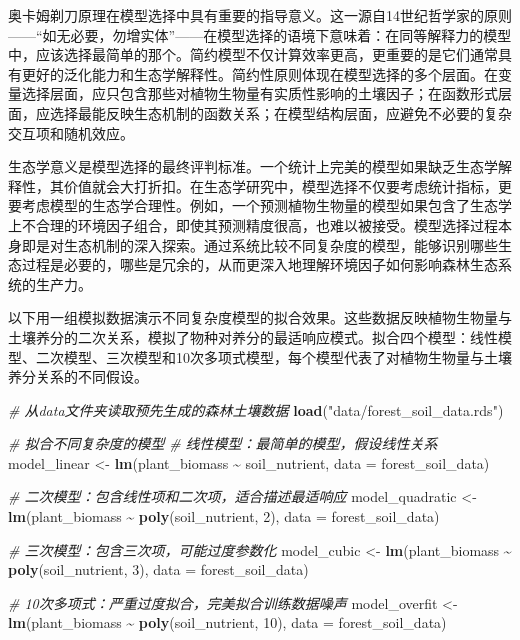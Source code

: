 \documentclass[
  twoside,12pt,fontset=none]{ctexbook}
\newenvironment{Shaded}{\begin{snugshade}}{\end{snugshade}}
\newcommand{\AttributeTok}[1]{\textcolor[rgb]{0.13,0.29,0.53}{#1}}
\newcommand{\CommentTok}[1]{\textcolor[rgb]{0.56,0.35,0.01}{\textit{#1}}}
\newcommand{\DecValTok}[1]{\textcolor[rgb]{0.00,0.00,0.81}{#1}}
\newcommand{\FunctionTok}[1]{\textcolor[rgb]{0.13,0.29,0.53}{\textbf{#1}}}
\newcommand{\NormalTok}[1]{#1}
\newcommand{\OtherTok}[1]{\textcolor[rgb]{0.56,0.35,0.01}{#1}}
\newcommand{\SpecialCharTok}[1]{\textcolor[rgb]{0.81,0.36,0.00}{\textbf{#1}}}
\newcommand{\StringTok}[1]{\textcolor[rgb]{0.31,0.60,0.02}{#1}}
\begin{document}
奥卡姆剃刀原理在模型选择中具有重要的指导意义。这一源自14世纪哲学家的原则------``如无必要，勿增实体''------在模型选择的语境下意味着：在同等解释力的模型中，应该选择最简单的那个。简约模型不仅计算效率更高，更重要的是它们通常具有更好的泛化能力和生态学解释性。简约性原则体现在模型选择的多个层面。在变量选择层面，应只包含那些对植物生物量有实质性影响的土壤因子；在函数形式层面，应选择最能反映生态机制的函数关系；在模型结构层面，应避免不必要的复杂交互项和随机效应。

生态学意义是模型选择的最终评判标准。一个统计上完美的模型如果缺乏生态学解释性，其价值就会大打折扣。在生态学研究中，模型选择不仅要考虑统计指标，更要考虑模型的生态学合理性。例如，一个预测植物生物量的模型如果包含了生态学上不合理的环境因子组合，即使其预测精度很高，也难以被接受。模型选择过程本身即是对生态机制的深入探索。通过系统比较不同复杂度的模型，能够识别哪些生态过程是必要的，哪些是冗余的，从而更深入地理解环境因子如何影响森林生态系统的生产力。

以下用一组模拟数据演示不同复杂度模型的拟合效果。这些数据反映植物生物量与土壤养分的二次关系，模拟了物种对养分的最适响应模式。拟合四个模型：线性模型、二次模型、三次模型和10次多项式模型，每个模型代表了对植物生物量与土壤养分关系的不同假设。

\begin{Shaded}
\begin{Highlighting}[]
\CommentTok{\# 从data文件夹读取预先生成的森林土壤数据}
\FunctionTok{load}\NormalTok{(}\StringTok{"data/forest\_soil\_data.rds"}\NormalTok{)}

\CommentTok{\# 拟合不同复杂度的模型}
\CommentTok{\# 线性模型：最简单的模型，假设线性关系}
\NormalTok{model\_linear }\OtherTok{\textless{}{-}} \FunctionTok{lm}\NormalTok{(plant\_biomass }\SpecialCharTok{\textasciitilde{}}\NormalTok{ soil\_nutrient, }\AttributeTok{data =}\NormalTok{ forest\_soil\_data)}

\CommentTok{\# 二次模型：包含线性项和二次项，适合描述最适响应}
\NormalTok{model\_quadratic }\OtherTok{\textless{}{-}} \FunctionTok{lm}\NormalTok{(plant\_biomass }\SpecialCharTok{\textasciitilde{}} \FunctionTok{poly}\NormalTok{(soil\_nutrient, }\DecValTok{2}\NormalTok{),}
  \AttributeTok{data =}\NormalTok{ forest\_soil\_data)}

\CommentTok{\# 三次模型：包含三次项，可能过度参数化}
\NormalTok{model\_cubic }\OtherTok{\textless{}{-}} \FunctionTok{lm}\NormalTok{(plant\_biomass }\SpecialCharTok{\textasciitilde{}} \FunctionTok{poly}\NormalTok{(soil\_nutrient, }\DecValTok{3}\NormalTok{),}
  \AttributeTok{data =}\NormalTok{ forest\_soil\_data)}

\CommentTok{\# 10次多项式：严重过度拟合，完美拟合训练数据噪声}
\NormalTok{model\_overfit }\OtherTok{\textless{}{-}} \FunctionTok{lm}\NormalTok{(plant\_biomass }\SpecialCharTok{\textasciitilde{}} \FunctionTok{poly}\NormalTok{(soil\_nutrient, }\DecValTok{10}\NormalTok{),}
  \AttributeTok{data =}\NormalTok{ forest\_soil\_data)}
\end{Highlighting}
\end{Shaded}
\end{document}
